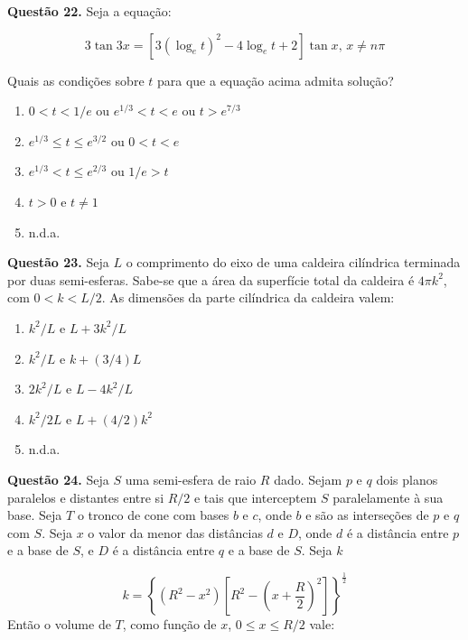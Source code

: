\documentclass[11pt]{article}
\begin{document}
\textbf{Questão 22.} Seja a equação: 

$$
3 \tan 3x = [3 (\log_e t)^2 - 4 \log_e t + 2] \tan x, \, x \neq n\pi
$$

Quais  as  condições  sobre  $t$  para  que  a  equação  acima  admita solução?

\begin{enumerate}[\bf A (\quad)]
    \item $0 < t < 1/e$ ou $e^{1/3} < t < e$ ou $t > e^{7/3}$
    \item $e^{1/3} \leq t \leq e^{3/2}$ ou $0 < t < e$
    \item $e^{1/3} < t \leq e^{2/3}$ ou $1/e > t$
    \item $t > 0$ e $t \neq 1$
    \item n.d.a.
\end{enumerate}


\textbf{Questão 23.} Seja  $L$  o  comprimento  do  eixo  de  uma  caldeira  cilíndrica terminada por duas semi-esferas. Sabe-se que a área  da  superfície  total  da  caldeira  é  $4\pi k^2$,  com  $0  <  k  <  L/2$. As dimensões da parte cilíndrica da caldeira valem: 

\begin{multicols}{3}
    \begin{enumerate}[\bf A (\quad)]
        \item $ k^2/L$ e $L + 3k^2/L $
        \item $ k^2/L$ e $k + (3/4)L$
        \item $2k^2 / L$ e $L - 4k^2 / L$
        \item $ k^2/2L$ e $L + (4/2)k^2$
        \item n.d.a.
    \end{enumerate}
\end{multicols}

\textbf{Questão 24.} Seja  $S$  uma  semi-esfera  de  raio  $R$  dado.  Sejam  $p$  e  $q$  dois  planos  paralelos  e  distantes  entre  si  $R/2$  e  tais  que  interceptem  $S$  paralelamente  à  sua  base.  Seja  $T$  o  tronco  de cone com bases $b$ e $c$, onde $b$ e são as interseções de $p$ e $q$ com $S$. Seja $x$ o valor da menor das distâncias $d$ e $D$, onde  $d$  é  a  distância  entre  $p$  e  a  base  de  $S$,  e  $D$  é  a  distância  entre  $q$  e  a  base  de  $S$.  Seja  $k$  

$$
k = \left\{ \left( R^2 - x^2 \right) \left[ R^2 - \left( x + \frac{R}{2} \right)^2 \right] \right\}^{\frac{1}{2}}
$$
%
Então  o  volume  de  $T$,  como  função  de  $x$,  $0 \leq x \leq R/2$ vale:  
\end{document}

